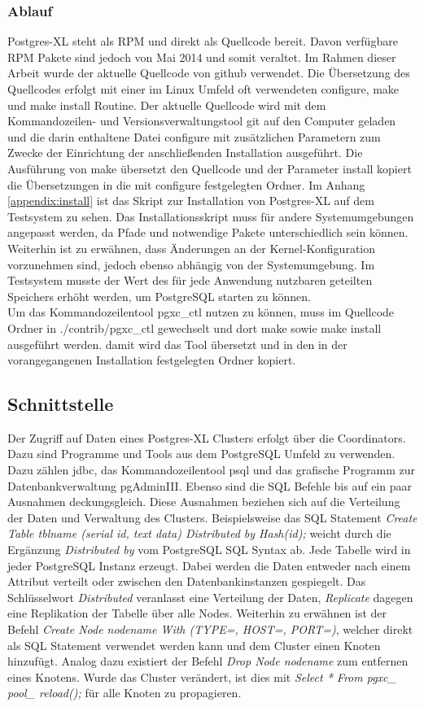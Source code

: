 \subsubsection{Ablauf}
Postgres-XL steht als RPM und direkt als Quellcode bereit.
Davon verfügbare RPM Pakete sind jedoch von Mai 2014 und somit veraltet.
Im Rahmen dieser Arbeit wurde der aktuelle Quellcode von github verwendet.
Die Übersetzung des Quellcodes erfolgt mit einer im Linux Umfeld oft verwendeten configure, make und make install Routine.
Der aktuelle Quellcode wird mit dem Kommandozeilen- und Versionsverwaltungstool git auf den Computer geladen und die darin enthaltene Datei configure mit zusätzlichen Parametern zum Zwecke der Einrichtung der anschließenden Installation ausgeführt.
Die Ausführung von make übersetzt den Quellcode und der Parameter install kopiert die Übersetzungen in die mit configure festgelegten Ordner.
Im Anhang \ref{appendix:install} ist das Skript zur Installation von Postgres-XL auf dem Testsystem zu sehen.
Das Installationsskript muss für andere Systemumgebungen angepasst werden, da Pfade und notwendige Pakete unterschiedlich sein können.
Weiterhin ist zu erwähnen, dass Änderungen an der Kernel-Konfiguration vorzunehmen  sind, jedoch ebenso abhängig von der Systemumgebung.
Im Testsystem musste der Wert des für jede Anwendung nutzbaren geteilten Speichers erhöht werden, um PostgreSQL starten zu können.\\
Um das Kommandozeilentool pgxc\_ctl nutzen zu können, muss im Quellcode Ordner in ./contrib/pgxc_ctl gewechselt und dort make sowie make install ausgeführt werden. damit wird das Tool übersetzt und in den in der vorangegangenen Installation festgelegten Ordner kopiert.

\subsection{Schnittstelle}
Der Zugriff auf Daten eines Postgres-XL Clusters erfolgt über die Coordinators.
Dazu sind Programme und Tools aus dem PostgreSQL Umfeld zu verwenden.
Dazu zählen \Gls{jdbc}, das Kommandozeilentool psql und das grafische Programm zur Datenbankverwaltung pgAdminIII.
Ebenso sind die SQL Befehle bis auf ein paar Ausnahmen deckungsgleich.
Diese Ausnahmen beziehen sich auf die Verteilung der Daten und Verwaltung des Clusters.
Beispielsweise das SQL Statement \textit{Create Table tblname (serial id, text data) Distributed by Hash(id);} weicht durch die Ergänzung \textit{Distributed by} vom PostgreSQL SQL Syntax ab.
Jede Tabelle wird in jeder PostgreSQL Instanz erzeugt.
Dabei werden die Daten entweder nach einem Attribut verteilt oder zwischen den Datenbankinstanzen gespiegelt.
Das Schlüsselwort \textit{Distributed} veranlasst eine Verteilung der Daten, \textit{Replicate} dagegen eine Replikation der Tabelle über alle Nodes.
Weiterhin zu erwähnen ist der Befehl \textit{Create Node nodename With (TYPE=, HOST=, PORT=)}, welcher direkt als SQL Statement verwendet werden kann und dem Cluster einen Knoten hinzufügt.
Analog dazu existiert der Befehl \textit{Drop Node nodename} zum entfernen eines Knotens.
Wurde das Cluster verändert, ist dies mit \textit{Select * From pgxc\_ pool\_ reload();} für alle Knoten zu propagieren.

